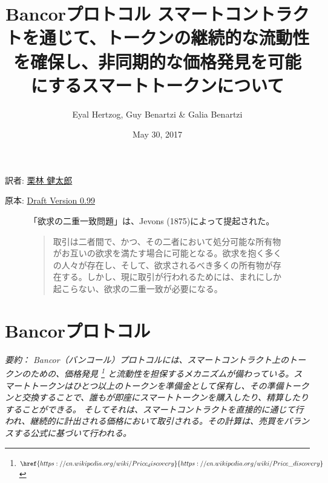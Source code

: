 \documentclass{jsarticle}
\begin{document}
\title{
  \textbf{Bancorプロトコル}
  \protect\linebreak
  \protect\linebreak
  \large
  スマートコントラクトを通じて、トークンの継続的な流動性を確保し、非同期的な価格発見を可能にするスマートトークンについて
}

\author{Eyal Hertzog, Guy Benartzi \& Galia Benartzi}
\date{May 30, 2017}

\maketitle

\begin{center}
  \item[訳者:] \href{https://kentarok.org}{栗林 健太郎}
  \item[原本:] \href{http://www.hyuki.com/girl/}{Draft Version 0.99}
\end{center}

\begin{figure}[b]
  「欲求の二重一致問題」は、Jevons (1875)によって提起された。

  \begin{quotation}  
    取引は二者間で、かつ、その二者において処分可能な所有物がお互いの欲求を満たす場合に可能となる。欲求を抱く多くの人々が存在し、そして、欲求されるべき多くの所有物が存在する。しかし、現に取引が行われるためには、まれにしか起こらない、欲求の二重一致が必要になる。
  \end{quotation}
\end{figure}

\newpage
\setcounter{tocdepth}{3}
\tableofcontents
\newpage

\section{Bancorプロトコル}

\emph{
  要約： Bancor（バンコール）プロトコルには、スマートコントラクト上のトークンのための、価格発見
  \footnote{
    $\href{
      https://en.wikipedia.org/wiki/Price_discovery
    }{
      https://en.wikipedia.org/wiki/Price\_discovery
    }$
  }
  と流動性を担保するメカニズムが備わっている。スマートトークンはひとつ以上のトークンを準備金として保有し、その準備トークンと交換することで、誰もが即座にスマートトークンを購入したり、精算したりすることができる。 そしてそれは、スマートコントラクトを直接的に通じて行われ、継続的に計出される価格において取引される。その計算は、売買をバランスする公式に基づいて行われる。
} \\
\end{document}
